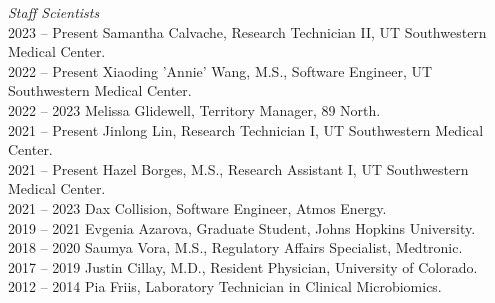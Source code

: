 \textit{Staff Scientists} \\
2023 -- Present \hspace{14pt} Samantha Calvache, Research Technician II, UT Southwestern Medical Center. \\
2022 -- Present \hspace{14pt} Xiaoding 'Annie' Wang, M.S., Software Engineer, UT Southwestern Medical Center. \\
2022 -- 2023 \hspace{28pt} Melissa Glidewell, Territory Manager, 89 North. \\
2021 -- Present \hspace{14pt} Jinlong Lin, Research Technician I, UT Southwestern Medical Center. \\
2021 -- Present \hspace{14pt} Hazel Borges, M.S., Research Assistant I, UT Southwestern Medical Center. \\
2021 -- 2023 \hspace{28pt} Dax Collision, Software Engineer, Atmos Energy. \\
2019 -- 2021 \hspace{28pt} Evgenia Azarova, Graduate Student, Johns Hopkins University. \\
2018 -- 2020 \hspace{28pt} Saumya Vora, M.S., Regulatory Affairs Specialist, Medtronic. \\
2017 -- 2019 \hspace{28pt} Justin Cillay, M.D., Resident Physician, University of Colorado. \\
2012 -- 2014 \hspace{28pt} Pia Friis,  Laboratory Technician in Clinical Microbiomics. \\


